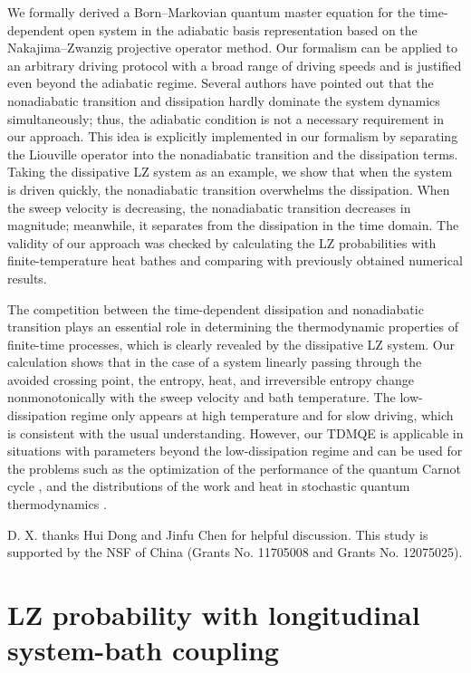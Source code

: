 \documentclass[english,nofootinbib, pra, twocolumn,superscriptaddress]{revtex4-1}
\begin{document}
We formally derived a Born--Markovian quantum master equation
for the time-dependent open system in the adiabatic basis representation
based on the Nakajima--Zwanzig projective operator method. Our formalism can be
applied to an arbitrary driving protocol with a broad range of driving
speeds and is justified even beyond the adiabatic regime. Several authors have
pointed out that the nonadiabatic transition and
dissipation hardly dominate the system dynamics simultaneously; thus,
the adiabatic condition is not a necessary requirement in our approach. This idea is explicitly implemented
in our formalism by separating the Liouville operator into the nonadiabatic
transition and the dissipation terms. Taking the dissipative LZ
system as an example, we show that when the system is driven quickly, the nonadiabatic
transition overwhelms the dissipation. When the
sweep velocity is decreasing, the nonadiabatic transition decreases in magnitude;
meanwhile, it separates from the dissipation in the time domain. The
validity of our approach was checked by calculating the LZ probabilities
with finite-temperature heat bathes and comparing with previously obtained numerical
results. 

The competition between the time-dependent dissipation and nonadiabatic
transition plays an essential role in determining the thermodynamic
properties of finite-time processes, which is clearly revealed by
the dissipative LZ system. Our calculation shows that in
the case of a system linearly passing through the avoided crossing point,
the entropy, heat, and irreversible entropy change nonmonotonically
with the sweep velocity and bath temperature. The low-dissipation regime
only appears at high temperature and for slow driving, which is consistent
with the usual understanding. However, our TDMQE is applicable in situations with parameters
beyond the low-dissipation regime and can be used for the problems such as the
optimization of the performance of the quantum Carnot cycle \citep{2018.Sun}, and the distributions
of the work and heat in stochastic quantum thermodynamics \citep{2013.Pekola,2014.liu,2014.Ala-Nissila,2014.Sassetti,2018.Quan,2015.Mottonen}.

\begin{acknowledgments}
D. X. thanks Hui Dong and Jinfu Chen for helpful discussion. This
study is supported by the NSF of China (Grants No. 11705008 and Grants
No. 12075025). 
\end{acknowledgments}

\appendix
\section{LZ probability with longitudinal system-bath coupling~\label{sec:A} }
\end{document}
